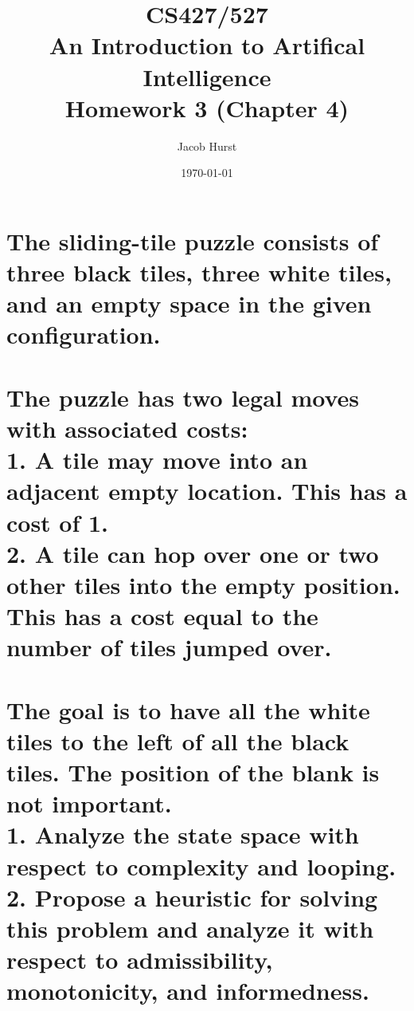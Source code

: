 \documentclass[11pt]{article}
\title{\textbf{CS427/527\\
               An Introduction to Artifical Intelligence\\
               Homework 3 (Chapter 4)}}
\author{Jacob Hurst}
\date{\today}
\begin{document}
\maketitle

\section{The sliding-tile puzzle consists of three black tiles, three white tiles, and an empty space in the given configuration.
\\\\The puzzle has two legal moves with associated costs:
\\1. A tile may move into an adjacent empty location. This has a cost of 1.
\\2. A tile can hop over one or two other tiles into the empty position. This has a cost equal to the number of tiles jumped over.
\\\\The goal is to have all the white tiles to the left of all the black tiles. The position of the blank is not important.
\\1. Analyze the state space with respect to complexity and looping.
\\2. Propose a heuristic for solving this problem and analyze it with respect to admissibility, monotonicity, and informedness.}
\end{document}
